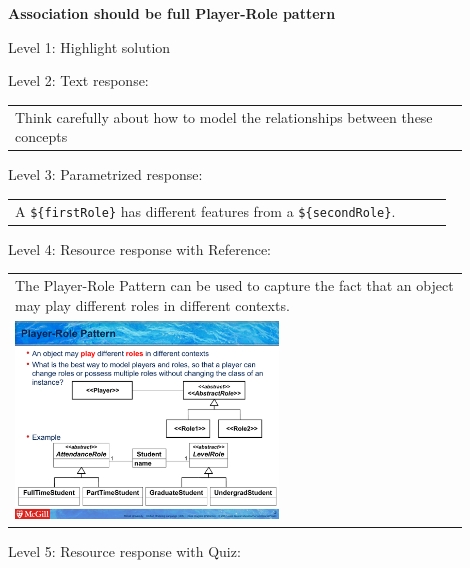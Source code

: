 \noindent \textbf{Association should be full Player-Role pattern} \medskip

\noindent Level 1: Highlight solution \medskip

\noindent Level 2: Text response: \medskip

\begin{tabular}{|p{0.9\linewidth}}
Think carefully about how to model the relationships between these concepts
\end{tabular} \medskip

\noindent Level 3: Parametrized response: \medskip

\begin{tabular}{|p{0.9\linewidth}}
A \verb|${firstRole}| has different features from a \verb|${secondRole}|.
\end{tabular} \medskip

\noindent Level 4: Resource response with Reference: \medskip

\begin{tabular}{|p{0.9\linewidth}}
The Player-Role Pattern can be used to capture the fact that an object may play different roles
in different contexts.

\\
\includegraphics[width=0.6\textwidth]{images/player_role.png}
\end{tabular} \medskip

\noindent Level 5: Resource response with Quiz: \medskip



